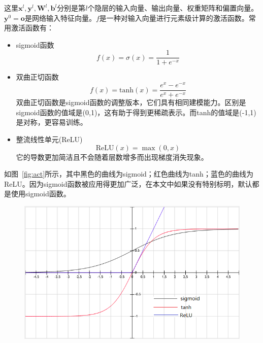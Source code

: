 这里$\mathbf{x}^l, \mathbf{y}^l, \mathbf{W}^l, \mathbf{b}^l$分别是第$l$个隐层的输入向量、输出向量、权重矩阵和偏置向量。$\mathbf{y}^0=\mathbf{o}$是网络输入特征向量。$f$是一种对输入向量进行元素级计算的激活函数。常用激活函数有：
\begin{itemize}
    \item sigmoid函数
    \begin{equation}
        f(x)=\sigma(x)=\frac{1}{1+e^{-x}}
    \end{equation}
    \item 双曲正切函数
    \begin{equation}
        f(x)=\text{tanh} (x)=\frac{e^x-e^{-x}}{e^{x}+e^{-x}}
    \end{equation}
    双曲正切函数是sigmoid函数的调整版本，它们具有相同建模能力。区别是sigmoid函数的值域是(0,1)，这有助于得到更稀疏表示。而tanh的值域是(-1,1)是对称，更容易训练。
    \item 整流线性单元(ReLU)
    \begin{equation}
        \text{ReLU}(x)= \max (0,x)
    \end{equation}
    它的导数更加简洁且不会随着层数增多而出现梯度消失现象。
\end{itemize}
如图~\ref{fig:act}所示，其中黑色的曲线为sigmoid；红色曲线为tanh；蓝色的曲线为ReLU。因为sigmoid函数被应用得更加广泛，在本文中如果没有特别标明，默认都是使用sigmoid函数。
\begin{figure}[!htp]
  \centering
    \captionstyle{\centering}
    \includegraphics[height=.5\textwidth]{figure/activation.png}
\end{figure}

